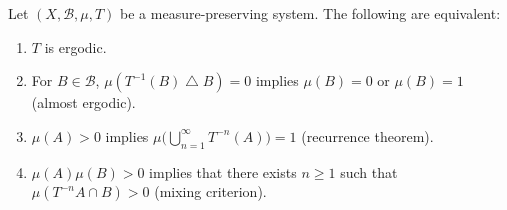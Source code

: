 \documentclass[11pt,a4paper]{article}
\begin{document}
\setcounter{theorem}{5}\begin{proposition}\label{prop:ergodicity-measure}
Let $(X,\mathcal B,\mu,T)$ be a measure-preserving system. The following are
equivalent:
\begin{enumerate}[label=(\arabic*)]
  \setcounter{enumi}{0}\item $T$ is ergodic.
  \setcounter{enumi}{1}\item For $B\in\mathcal B$, $\mu(T^{-1}(B)\mathbin\triangle B)=0$ implies
  $\mu(B)=0$ or $\mu(B)=1$ (almost ergodic).
  \setcounter{enumi}{2}\item $\mu(A)>0$ implies
  $\mu\bigl(\bigcup_{n=1}^{\infty}T^{-n}(A)\bigr)=1$
  (recurrence theorem).
  \setcounter{enumi}{3}\item $\mu(A)\mu(B)>0$ implies that there exists $n\geq1$ such that
  $\mu(T^{-n}A\cap B)>0$ (mixing criterion).
\end{enumerate}
\end{proposition}
\end{document}
